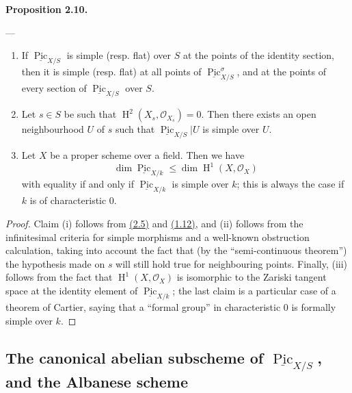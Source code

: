 \documentclass{article}
\providecommand{\tightlist}{%
  \setlength{\itemsep}{0pt}\setlength{\parskip}{0pt}}
\newenvironment{itenv}[1]
  {\phantomsection\par\smallskip\noindent\textbf{#1.}\itshape}
  {\par\smallskip}
\newcommand{\oldpage}[1]{\marginpar{\footnotesize$\Big\vert$ \textit{p.~#1}}}
\theoremstyle{definition}
\theoremstyle{definition}
\theoremstyle{definition}
\theoremstyle{definition}
\theoremstyle{remark}
\begin{document}
\hypertarget{fga-3-vi-proposition-2.10}{}
\begin{itenv}{Proposition 2.10}

---

\begin{enumerate}
\def\labelenumi{\roman{enumi}.}
\tightlist
\item
  If \(\underline{\operatorname{Pic}}_{X/S}\) is simple (resp. flat) over \(S\) at the points of the identity section, then it is simple (resp. flat) at all points of \(\underline{\operatorname{Pic}}_{X/S}^\sigma\), and at the points of every section of \(\underline{\operatorname{Pic}}_{X/S}\) over \(S\).
\item
  \oldpage{236-16}Let \(s\in S\) be such that \(\operatorname{H}^2(X_s,{\mathscr{O}}_{X_s})=0\).
  Then there exists an open neighbourhood \(U\) of \(s\) such that \(\underline{\operatorname{Pic}}_{X/S}|U\) is simple over \(U\).
\item
  Let \(X\) be a proper scheme over a field.
  Then we have
  \[
      \dim\underline{\operatorname{Pic}}_{X/k}
      \leqslant\dim\operatorname{H}^1(X,{\mathscr{O}}_X)
    \]
  with equality if and only if \(\underline{\operatorname{Pic}}_{X/k}\) is simple over \(k\);
  this is always the case if \(k\) is of characteristic \(0\).
\end{enumerate}

\end{itenv}

\begin{proof}
Claim (i) follows from \protect\hyperlink{fga-3-vi-theorem-2.5}{(2.5)} and \protect\hyperlink{fga-3-vi-corollary-1.12}{(1.12)}, and (ii) follows from the infinitesimal criteria for simple morphisms and a well-known obstruction calculation, taking into account the fact that (by the ``semi-continuous theorem'') the hypothesis made on \(s\) will still hold true for neighbouring points.
Finally, (iii) follows from the fact that \(\operatorname{H}^1(X,{\mathscr{O}}_X)\) is isomorphic to the Zariski tangent space at the identity element of \(\underline{\operatorname{Pic}}_{X/k}\);
the last claim is a particular case of a theorem of Cartier, saying that a ``formal group'' in characteristic \(0\) is formally simple over \(k\).
\end{proof}

\hypertarget{fga-3-vi-section-3}{%
\subsection{\texorpdfstring{The canonical abelian subscheme of \(\underline{\operatorname{Pic}}_{X/S}\), and the Albanese scheme}{The canonical abelian subscheme of \textbackslash underline\{\textbackslash operatorname\{Pic\}\}\_\{X/S\}, and the Albanese scheme}}\label{fga-3-vi-section-3}}
\end{document}
